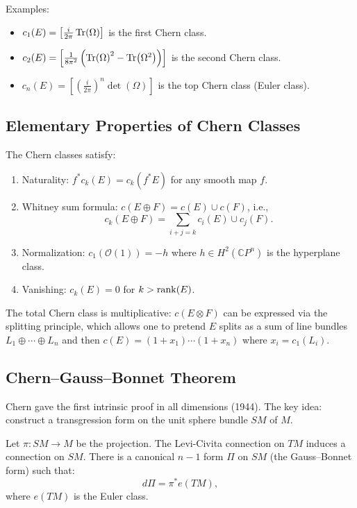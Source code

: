 Examples:
\begin{itemize}
    \item $c_1(E) = \left[\frac{i}{2\pi} \Tr(\Omega)\right]$ is the first Chern class.
    \item $c_2(E) = \left[ \frac{1}{8\pi^2} \left( \Tr(\Omega)^2 - \Tr(\Omega^2) \right) \right]$ is the second Chern class.
    \item $c_n(E) = \left[ \left(\frac{i}{2\pi}\right)^n \det(\Omega) \right]$ is the top Chern class (Euler class).
\end{itemize}

\subsection{Elementary Properties of Chern Classes}

The Chern classes satisfy:
\begin{enumerate}
    \item Naturality: $f^* c_k(E) = c_k(f^* E)$ for any smooth map $f$.
    \item Whitney sum formula: $c(E \oplus F) = c(E) \cup c(F)$, i.e.,
    \[
    c_k(E \oplus F) = \sum_{i+j=k} c_i(E) \cup c_j(F).
    \]
    \item Normalization: $c_1(\mathcal{O}(1)) = -h$ where $h \in H^2(\mathbb{C}P^n)$ is the hyperplane class.
    \item Vanishing: $c_k(E) = 0$ for $k > \rank(E)$.
\end{enumerate}

The total Chern class is multiplicative: $c(E \otimes F)$ can be expressed via the splitting principle, which allows one to pretend $E$ splits as a sum of line bundles $L_1 \oplus \cdots \oplus L_n$ and then $c(E) = (1 + x_1) \cdots (1 + x_n)$ where $x_i = c_1(L_i)$.

\subsection{Chern--Gauss--Bonnet Theorem}

Chern gave the first intrinsic proof in all dimensions (1944). The key idea: construct a transgression form on the unit sphere bundle $SM$ of $M$.

Let $\pi: SM \to M$ be the projection. The Levi-Civita connection on $TM$ induces a connection on $SM$. There is a canonical $n-1$ form $\Pi$ on $SM$ (the Gauss--Bonnet form) such that:
\[
d\Pi = \pi^* e(TM),
\]
where $e(TM)$ is the Euler class.

